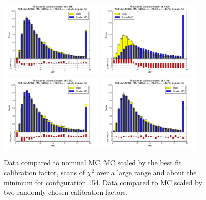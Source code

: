 \begin{figure}[htbp]
\begin{center}
\includegraphics[width=0.45\textwidth]{../FIGURES/154/FIG_Fit_result_for_calibration_factor_of_0_556.pdf} 
\includegraphics[width=0.45\textwidth]{../FIGURES/154/FIG_Fit_result_for_calibration_factor_of_1_900.pdf} 
\includegraphics[width=0.45\textwidth]{../FIGURES/154/FIG_Fit_result_for_calibration_factor_of_0_532.pdf} 
\includegraphics[width=0.45\textwidth]{../FIGURES/154/FIG_Fit_result_for_calibration_factor_of_1_148.pdf} 
\caption{Data compared to nominal MC, MC scaled by the best fit calibration factor, scans of $\chi^2$ over a large range and about the minimum for configuration 154. Data compared to MC scaled by two randomly chosen calibration factors.} 
\label{tab:best_154} 
\end{center} \end{figure} 

